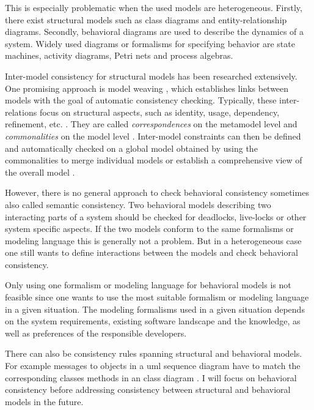 \documentclass[conference]{IEEEtran}
\begin{document}
This is especially problematic when the used models are heterogeneous.
Firstly, there exist structural models such as class diagrams and entity-relationship diagrams.
Secondly, behavioral diagrams are used to describe the dynamics of a system.
Widely used diagrams or formalisms for specifying behavior are state machines, activity diagrams, Petri nets and process algebras.

Inter-model consistency for structural models has been researched extensively.
One promising approach is model weaving \cite{bezivinCanonicalSchemeModel2006}, which establishes links between models with the goal of automatic consistency checking.
Typically, these inter-relations focus on structural aspects, such as identity, usage, dependency, refinement, etc. \cite{feldmannManagingIntermodelInconsistencies2019, torresSystematicLiteratureReview2020}.
They are called \textit{correspondences} on the metamodel level and \textit{commonalities} on the model level \cite{stunkelMultipleModelSynchronization2020, klareCommonalitiesPreservingConsistency2019}.
Inter-model constraints can then be defined and automatically checked on a global model obtained by using the commonalities to merge individual models \cite{stunkelMultimodelCorrespondenceIntermodel2018} or establish a comprehensive view of the overall model \cite{stunkelMultipleModelSynchronization2020}.

However, there is no general approach to check behavioral consistency sometimes also called semantic consistency.
Two behavioral models describing two interacting parts of a system should be checked for deadlocks, live-locks or other system specific aspects.
If the two models conform to the same formalisms or modeling language this is generally not a problem.
But in a heterogeneous case one still wants to define interactions between the models and check behavioral consistency.

Only using one formalism or modeling language for behavioral models is not feasible since one wants to use the most suitable formalism or modeling language in a given situation.
The modeling formalisms used in a given situation depends on the system requirements, existing software landscape and the knowledge, as well as preferences of the responsible developers. 

There can also be consistency rules spanning structural and behavioral models.
For example messages to objects in a \gls{uml} sequence diagram have to match the corresponding classes methods in an class diagram \cite{egyedFixingInconsistenciesUML2007}.
I will focus on behavioral consistency before addressing consistency between structural and behavioral models in the future. 
\end{document}
